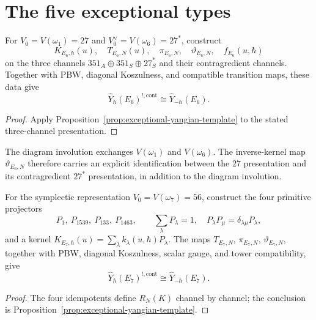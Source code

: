 \section{The five exceptional types}
\label{sec:exceptional-yangian-per-type}

\begin{proposition}
\label{prop:exceptional-yangian-koszul-E6}
For $V_0=V(\omega_1)=27$ and $V_0^\vee=V(\omega_6)=27^*$, construct
\[
K_{E_6,\hbar}(u),\quad T_{E_6,N}(u),\quad
\pi_{E_6,N},\quad\vartheta_{E_6,N},\quad f_{E_6}(u,\hbar)
\]
on the three channels
$351_A\oplus351_S\oplus27^*_S$ and their contragredient channels.
Together with PBW, diagonal Koszulness, and compatible transition maps,
these data give
\[
\widehat Y_\hbar(E_6)^{!,\mathrm{cont}}
\cong\widehat Y_{-\hbar}(E_6).
\]
\end{proposition}

\begin{proof}
Apply Proposition~\ref{prop:exceptional-yangian-template} to the stated
three-channel presentation.
\end{proof}

\begin{remark}
\label{rem:exceptional-yangian-E6-outer}
The diagram involution exchanges $V(\omega_1)$ and $V(\omega_6)$.
The inverse-kernel map $\vartheta_{E_6,N}$ therefore carries an explicit
identification between the $27$ presentation and its contragredient
$27^*$ presentation, in addition to the diagram involution.
\end{remark}

\begin{proposition}
\label{prop:exceptional-yangian-koszul-E7}
For the symplectic representation $V_0=V(\omega_7)=56$, construct the
four primitive projectors
\[
P_1,\ P_{1539},\ P_{133},\ P_{1463},
\qquad
\sum_\lambda P_\lambda=1,
\quad P_\lambda P_\mu=\delta_{\lambda\mu}P_\lambda,
\]
and a kernel
$K_{E_7,\hbar}(u)=\sum_\lambda k_\lambda(u,\hbar)P_\lambda$.
The maps $T_{E_7,N}$, $\pi_{E_7,N}$, $\vartheta_{E_7,N}$, together
with PBW, diagonal Koszulness, scalar gauge, and tower compatibility,
give
\[
\widehat Y_\hbar(E_7)^{!,\mathrm{cont}}
\cong\widehat Y_{-\hbar}(E_7).
\]
\end{proposition}

\begin{proof}
The four idempotents define $R_N(K)$ channel by channel; the conclusion
is Proposition~\ref{prop:exceptional-yangian-template}.
\end{proof}

